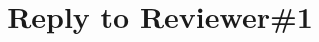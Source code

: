 \documentclass[preprint,3p,times]{elsarticle}
\begin{document}
\begin{frontmatter}
    \title{Reply to Reviewer\#1}
\end{frontmatter}


\setlength{\parskip}{0.8em}









\end{document}
